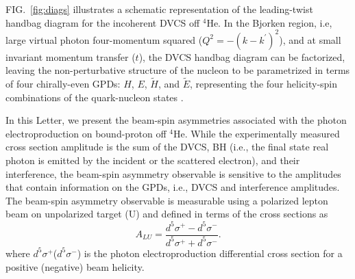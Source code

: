 \documentclass[twocolumn,nofootinbib,showpacs,prl,superscriptaddress,secnumarabic,amssymb,nobibnotes,aps,floatfix]{revtex4}
\begin{document}
FIG.~\ref{fig:diags} illustrates a schematic representation of the 
leading-twist handbag diagram for the incoherent DVCS off $^{4}$He. In the 
Bjorken region, i.e, large virtual photon four-momentum squared 
($Q^{2}=-(k-k^\prime)^2$), and at small invariant momentum transfer ($t$), the 
DVCS handbag diagram can be factorized, leaving the non-perturbative structure 
of the nucleon to be parametrized in terms of four chirally-even GPDs: $H$, 
$E$, $\widetilde{H}$, and $\widetilde{E}$, representing the four helicity-spin 
combinations of the quark-nucleon states \cite{Freund_Collins,Ji_Osborne}.

In this Letter, we present the beam-spin asymmetries associated with the photon 
electroproduction on bound-proton off $^{4}$He. While the experimentally 
measured cross section amplitude is the sum of the DVCS, BH (i.e., the final 
state real photon is emitted by the incident or the scattered electron), and 
their interference, the beam-spin asymmetry observable is sensitive to the 
amplitudes that contain information on the GPDs, i.e., DVCS and interference 
amplitudes. The beam-spin asymmetry observable is measurable using a polarized 
lepton beam on unpolarized target (U) and defined in terms of the cross 
sections as
\begin{equation}
  A_{LU} = \frac{d^{5}\sigma^{+} - d^{5}\sigma^{-} }
                {d^{5}\sigma^{+} + d^{5}\sigma^{-}}.
    \label{BSA_equation}
  \end{equation}
where $d^{5}\sigma^{+}$($d^{5}\sigma^{-}$) is the photon electroproduction 
differential cross section for a positive (negative) beam helicity. 
\end{document}
